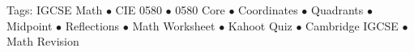 \documentclass[11pt,a4paper]{article}
\begin{document}
\vspace{14pt}
\begin{center}
  \sffamily\scriptsize\textcolor{textmuted}{
    Tags: IGCSE Math $\bullet$ CIE 0580 $\bullet$ 0580 Core $\bullet$ Coordinates $\bullet$ Quadrants $\bullet$ Midpoint $\bullet$ Reflections $\bullet$ Math Worksheet $\bullet$ Kahoot Quiz $\bullet$ Cambridge IGCSE $\bullet$ Math Revision
  }
\end{center}
\end{document}
